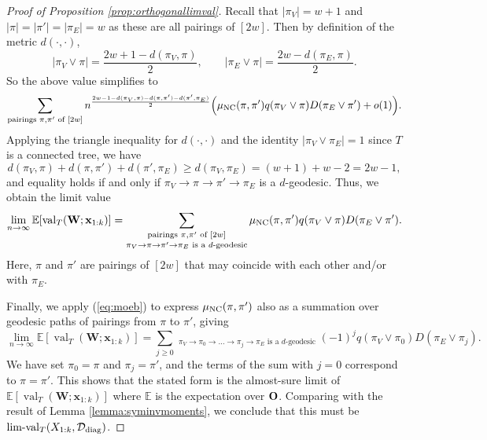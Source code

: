 \documentclass[10pt,reqno]{amsart}
\def\x{\mathbf{x}}
\def\W{\mathbf{W}}
\def\E{\mathbb{E}}
\def\val{\operatorname{val}}
\def\limval{\operatorname{lim-val}}
\newcommand{\tdiag}{\mathrm{diag}}
\begin{document}
\begin{proof}[Proof of Proposition \ref{prop:orthogonallimval}]
Recall that $|\pi_V|=w+1$ and $|\pi|=|\pi'|=|\pi_E|=w$ as these are all pairings
of $[2w]$. Then by definition of the metric $d(\cdot,\cdot)$,
\[|\pi_V \vee \pi|=\frac{2w+1-d(\pi_V,\pi)}{2},
\qquad |\pi_E \vee \pi|=\frac{2w-d(\pi_E,\pi)}{2}.\]
So the above value simplifies to
\[\sum_{\text{pairings } \pi,\pi' \text{ of } [2w]}
n^{\frac{2w-1-d(\pi_V,\pi)-d(\pi,\pi')-d(\pi',\pi_E)}{2}}
\Big(\mu_{\mathrm{NC}}(\pi,\pi')q(\pi_V \vee \pi)D(\pi_E \vee \pi')+o(1)\Big).\]
Applying the triangle inequality for $d(\cdot,\cdot)$ and the identity $|\pi_V
\vee \pi_E|=1$ since $T$ is a connected tree, we have
\[d(\pi_V,\pi)+d(\pi,\pi')+d(\pi',\pi_E)
\geq d(\pi_V,\pi_E)=(w+1)+w-2=2w-1,\]
and equality holds if and only if $\pi_V \to \pi \to \pi' \to \pi_E$ is a
$d$-geodesic. Thus, we obtain the limit value
\begin{equation}\label{eq:orthoglimitvalue}
\lim_{n \to \infty} \E[\val_T(\W;\x_{1:k})]
=\mathop{\sum_{\text{pairings } \pi,\pi' \text{ of }
[2w]}}_{\pi_V \to \pi \to \pi' \to \pi_E \text{ is a } d\text{-geodesic}}
\Moeb(\pi,\pi')q(\pi_V \vee \pi)D(\pi_E \vee \pi').
\end{equation}
Here, $\pi$ and $\pi'$ are pairings of $[2w]$ that may coincide with each
other and/or with $\pi_E$.

Finally, we apply (\ref{eq:moeb}) to express $\mu_{\mathrm{NC}}(\pi,\pi')$ also as a
summation over geodesic paths of pairings from $\pi$ to $\pi'$, giving
\[\lim_{n \to \infty} \E[\val_T(\W;\x_{1:k})]
=\sum_{j \geq 0} \mathop{\sum_{\text{distinct pairings }
\pi_0,\ldots,\pi_j \text{ of } [2w]}}_{\pi_V \to \pi_0 \to \ldots \to \pi_j
\to \pi_E \text{ is a } d\text{-geodesic}}
(-1)^j q(\pi_V \vee \pi_0)D(\pi_E \vee \pi_j).\]
We have set $\pi_0=\pi$ and $\pi_j=\pi'$, and the terms of the sum with $j=0$
correspond to $\pi=\pi'$. This shows that the stated form is the almost-sure
limit of $\E[\val_T(\W;\x_{1:k})]$ where $\E$ is the expectation over
$\mathbf{O}$. Comparing with the result of Lemma
\ref{lemma:syminvmoments}, we conclude that this must be
$\limval_T(X_{1:k},\cD_\tdiag)$.
\end{proof}
\end{document}
